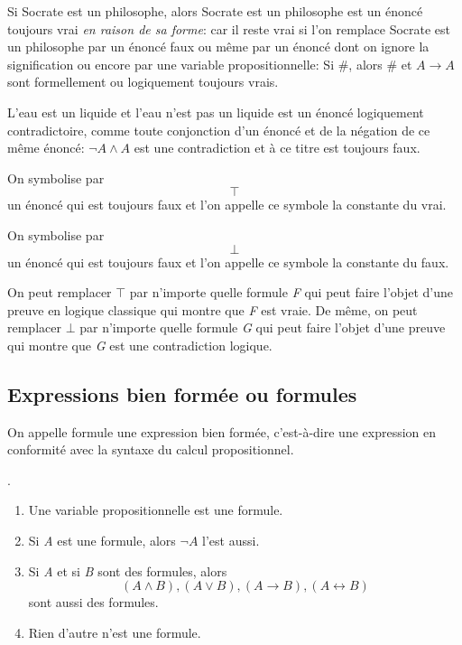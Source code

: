 \documentclass[article,reqno,times,12pt,french]{smfart}
\begin{document}
\begin{exem}
\og Si Socrate est un philosophe, alors Socrate est un philosophe\fg{} est un
énoncé toujours  vrai \emph{en raison de sa forme}: car il reste vrai si  l'on remplace
\og Socrate est un  philosophe\fg{} par un énoncé faux ou  même par un énoncé
dont  on   ignore  la  signification   ou  encore  par   une  variable
propositionnelle: \og Si \#, alors \#\fg{} et \og \(A \to A\)\fg{} sont formellement ou
logiquement toujours vrais.
\end{exem}

\begin{exem}
\og L'eau est  un liquide et  l'eau n'est pas  un liquide\fg{} est  un énoncé
logiquement contradictoire, comme toute  conjonction d'un énoncé et de
la  négation  de  ce  même  énoncé:   \(\lnot  A  \land  A\)  est  une
contradiction et à ce titre est toujours faux. 
\end{exem}

On symbolise par 
\[
\top
\] 
un  énoncé qui  est  toujours  faux et  l'on  appelle  ce symbole  \og la
constante du vrai\fg{}.

On symbolise par 
\[
\bot
\]
un  énoncé qui  est  toujours  faux et  l'on  appelle  ce symbole  \og la
constante du faux\fg{}.

\begin{rema}
On  peut remplacer  \(\top\) par  n'importe quelle  formule \emph{F} qui  peut
faire l'objet  d'une preuve en  logique classique qui montre  que \emph{F}
est  vraie.  De même, on  peut  remplacer  \(\bot\) par  n'importe  quelle
formule \emph{G}  qui peut faire l'objet  d'une preuve qui montre  que \emph{G}
est une contradiction logique. 
\end{rema}

\subsection{Expressions bien formée ou \og formules\fg{}}
\label{sec:orgd85867a}
\begin{defi}
On  appelle \og formule\fg{}  une  expression bien  formée, c'est-à-dire  une
expression en conformité avec la syntaxe du calcul propositionnel. 
\end{defi}
\begin{defi}
[Formule].

\begin{enumerate}
\item Une  variable propositionnelle est une formule.
\item Si \emph{A} est une formule, alors \(\lnot A\) l'est aussi.
\item Si \emph{A}  et si \emph{B} sont  des formules, alors \[(A \land  B), (A \lor
   B), (A \to B), (A \leftrightarrow B)\] sont aussi des formules.
\item Rien d'autre n'est une formule.
\end{enumerate}
\end{defi}
\end{document}
